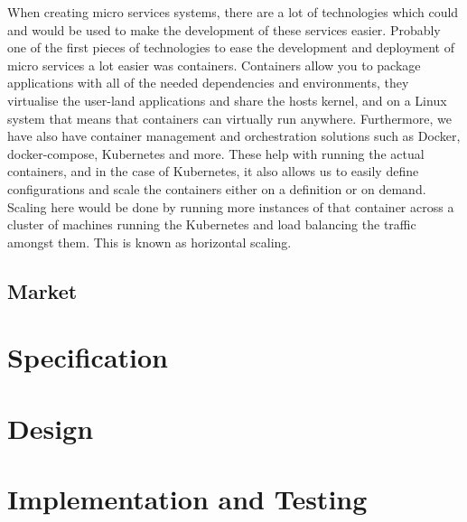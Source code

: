 \documentclass[twocolumn]{article}
\begin{document}
When creating micro services systems, there are a lot of technologies which could and would be used to make the development of these services easier. Probably one of the first pieces of technologies to ease the development and deployment of micro services a lot easier was containers. Containers allow you to package applications with all of the needed dependencies and environments, they virtualise the user-land applications and share the hosts kernel, and on a Linux system that means that containers can virtually run anywhere. Furthermore, we have also have container management and orchestration solutions such as Docker\cite{Docker}, docker-compose\cite{Docker}, Kubernetes\cite{k8s} and more. These help with running the actual containers, and in the case of Kubernetes, it also allows us to easily define configurations and scale the containers either on a definition or on demand. Scaling here would be done by running more instances of that container across a cluster of machines running the Kubernetes and load balancing the traffic amongst them. This is known as horizontal scaling. 



\subsection{Market} %

\section{Specification}
\vspace{-1ex}

\section{Design}
\vspace{-1ex}


\section{Implementation and Testing}
\vspace{-1ex}
\end{document}
